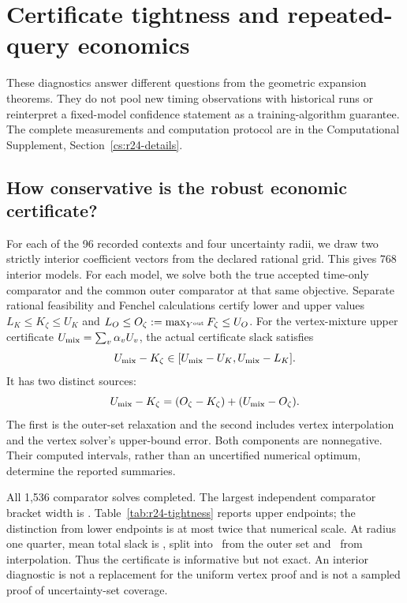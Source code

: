 \section{Certificate tightness and repeated-query economics}\label{sec:r24-diagnostics}
These diagnostics answer different questions from the geometric expansion
theorems. They do not pool new timing observations with historical runs or
reinterpret a fixed-model confidence statement as a training-algorithm
guarantee. The complete measurements and computation protocol are in the
Computational Supplement, Section~\ref{cs:r24-details}.

\subsection{How conservative is the robust economic certificate?}
For each of the 96 recorded contexts and four uncertainty radii, we draw two
strictly interior coefficient vectors from the declared rational grid. This
gives 768 interior models. For each model, we solve both the true accepted
time-only comparator and the common outer comparator at that same objective.
Separate rational feasibility and Fenchel calculations certify lower and upper
values $L_K\leq K_\zeta\leq U_K$ and
$L_O\leq O_\zeta:=\max_{Y^{\rm out}}F_\zeta\leq U_O$.
For the vertex-mixture upper certificate
$U_{\rm mix}=\sum_v\alpha_vU_v$, the actual certificate slack satisfies
\[
 U_{\rm mix}-K_\zeta\in[U_{\rm mix}-U_K,U_{\rm mix}-L_K].
\]
It has two distinct sources:
\[
 U_{\rm mix}-K_\zeta=(O_\zeta-K_\zeta)+(U_{\rm mix}-O_\zeta).
\]
The first is the outer-set relaxation and the second includes vertex
interpolation and the vertex solver's upper-bound error. Both components are
nonnegative. Their computed intervals, rather than an uncertified numerical
optimum, determine the reported summaries.

All 1,536 comparator solves completed. The largest independent comparator
bracket width is \RTwentyFourInteriorGap. Table~\ref{tab:r24-tightness} reports
upper endpoints; the distinction from lower endpoints is at most twice that numerical
scale. At radius one quarter, mean total slack is
\RTwentyFourSlackTotal, split into \RTwentyFourSlackOuter\ from the outer set
and \RTwentyFourSlackInterpolation\ from interpolation. Thus the certificate
is informative but not exact. An interior diagnostic is not a replacement for
the uniform vertex proof and is not a sampled proof of uncertainty-set coverage.

